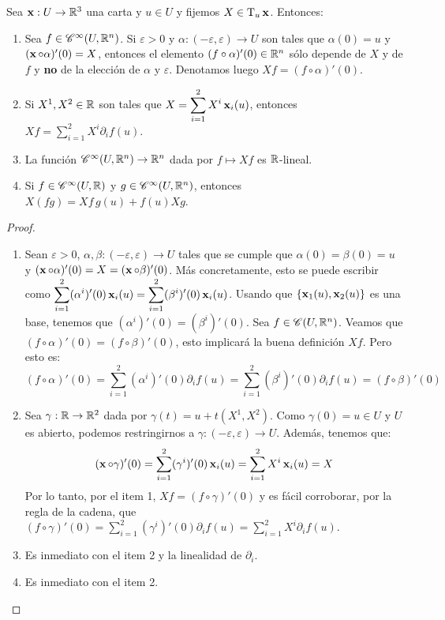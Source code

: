 \begin{prop}\label{prop::tangenteconcartas}
Sea $\operatorname{\mathbf{x}}:U\to\mathbb{R}^3$ una carta y $u\in U$ y fijemos $X\in\mathrm{T}_u\operatorname{\mathbf{x}}$. Entonces:
\begin{enumerate}
\item Sea $f\in\mathscr{C}^\infty(U,\mathbb{R}^n)$. Si $\varepsilon>0$ y $\alpha:(-\varepsilon,\varepsilon)\to U$ son tales que $\alpha(0)=u$ y $(\operatorname{\mathbf{x}}\circ\alpha)'(0)=X$, entonces el elemento $(f\circ\alpha)'(0)\in\mathbb{R}^n$ sólo depende de $X$ y de $f$ y \textbf{no} de la elección de $\alpha$ y $\varepsilon$. Denotamos luego $Xf=(f\circ\alpha)'(0)$.
\item Si $X^1,X^2\in\mathbb{R}$ son tales que $X=\displaystyle\sum_{i=1}^2 X^i\operatorname{\mathbf{x}}_i(u)$, entonces $Xf = \displaystyle\sum_{i=1}^2 X^i\partial_i f(u)$.
\item La función $\mathscr{C}^\infty(U,\mathbb{R}^n)\to\mathbb{R}^n$ dada por $f\mapsto Xf$ es $\mathbb{R}$-lineal.
\item Si $f\in\mathscr{C}^\infty(U,\mathbb{R})$ y $g\in\mathscr{C}^\infty(U,\mathbb{R}^n)$, entonces $X(fg)=Xf\, g(u) + f(u)Xg$.
\end{enumerate}
\begin{proof}
\hfill

\begin{enumerate}
\item Sean $\varepsilon>0$, $\alpha,\beta:(-\varepsilon,\varepsilon)\to U$ tales que se cumple que $\alpha(0)=\beta(0)=u$ y $(\operatorname{\mathbf{x}}\circ\alpha)'(0)=X=(\operatorname{\mathbf{x}}\circ\beta)'(0)$. Más concretamente, esto se puede escribir como $\displaystyle\sum_{i=1}^2 (\alpha^i)'(0)\operatorname{\mathbf{x}}_i(u) = \displaystyle\sum_{i=1}^2 (\beta^i)'(0)\operatorname{\mathbf{x}}_i(u)$. Usando que $\{\operatorname{\mathbf{x}}_1(u),\operatorname{\mathbf{x}}_2(u)\}$ es una base, tenemos que $(\alpha^i)'(0)=(\beta^i)'(0)$.
Sea $f\in\mathscr{C}(U,\mathbb{R}^n)$. Veamos que $(f\circ\alpha)'(0)=(f\circ\beta)'(0)$, esto implicará la buena definición $Xf$. Pero esto es: $$(f\circ\alpha)'(0)=\displaystyle\sum_{i=1}^2 (\alpha^i)'(0)\partial_i f(u) = \displaystyle\sum_{i=1}^2 (\beta^i)'(0)\partial_{i} f(u)=(f\circ\beta)'(0)$$
\item Sea $\gamma:\mathbb{R}\to\mathbb{R}^2$ dada por $\gamma(t)=u+t(X^1,X^2)$. Como $\gamma(0)=u\in U$ y $U$ es abierto, podemos restringirnos a $\gamma:(-\varepsilon,\varepsilon)\to U$. Además, tenemos que: $$(\operatorname{\mathbf{x}}\circ\gamma)'(0)=\displaystyle\sum_{i=1}^2 (\gamma^i)'(0)\operatorname{\mathbf{x}}_i(u) = \displaystyle\sum_{i=1}^2 X^i \operatorname{\mathbf{x}}_i(u)=X$$ Por lo tanto, por el item 1, $Xf=(f\circ\gamma)'(0)$ y es fácil corroborar, por la regla de la cadena, que $(f\circ\gamma)'(0)=\displaystyle\sum_{i=1}^2 (\gamma^i)'(0)\partial_i f(u)=\displaystyle\sum_{i=1}^2 X^i\partial_i f(u)$.
\item Es inmediato con el item 2 y la linealidad de $\partial_i$.
\item Es inmediato con el item 2.
\end{enumerate}
\end{proof}
\end{prop}

